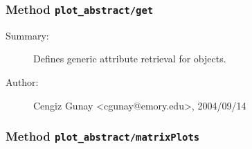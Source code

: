 \subsubsection[Method \texttt{get}]{Method \texttt{plot\_abstract/get}}%
%
\label{ref_plot_abstract__get}%
\hypertarget{ref_plot_abstract__get}{}%
\begin{description}
\item[Summary:]Defines generic attribute retrieval for objects.
%
%
%
%
%
%
%
\item[Author:]%
Cengiz Gunay <cgunay@emory.edu>, 2004/09/14
%
\end{description}
\methodline%
\subsubsection[Method \texttt{matrixPlots}]{Method \texttt{plot\_abstract/matrixPlots}}%
%
\label{ref_plot_abstract__matrixPlots}%
\hypertarget{ref_plot_abstract__matrixPlots}{}%
